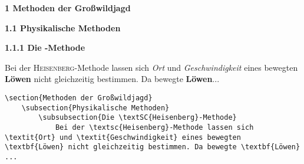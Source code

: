 \begin{frame}[fragile]
	\Losung
	\begin{outputbox}
		{ \LARGE\textbf{1 Methoden der Großwildjagd}} 
		
		{ \Large\textbf{1.1 Physikalische Methoden}}
		
		{ \large\textbf{1.1.1 Die -Methode}}
		
		Bei der \textsc{Heisenberg}-Methode lassen sich \textit{Ort} und \textit{Geschwindigkeit} eines bewegten \textbf{Löwen} nicht gleichzeitig bestimmen. Da bewegte \textbf{Löwen}...
	\end{outputbox}
	
	\Code
	\begin{lstlisting}
\section{Methoden der Großwildjagd}
	\subsection{Physikalische Methoden}
		\subsubsection{Die \textSC{Heisenberg}-Methode}	
			Bei der \textsc{Heisenberg}-Methode lassen sich \textit{Ort} und \textit{Geschwindigkeit} eines bewegten \textbf{Löwen} nicht gleichzeitig bestimmen. Da bewegte \textbf{Löwen} ...
	\end{lstlisting}
\end{frame}
